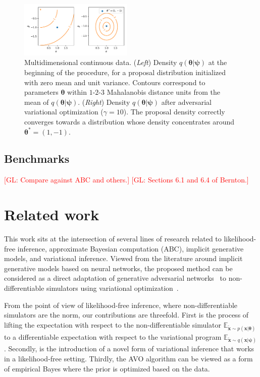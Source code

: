 \documentclass{article}
\newcommand{\glnote}[1]{\textcolor{red}{[GL: #1]}}
\newcommand{\bftheta}{{\bm \theta}}
\newcommand{\bfpsi}{{\bm \psi}}
\newcommand{\bfx}{\mathbf{x}}
\theoremstyle{plain}
\begin{document}
\begin{figure}
\centering
\includegraphics[width=0.48\textwidth]{figures/multi.pdf}
\caption{Multidimensional continuous data.
 ({\it Left}) Density $q(\bftheta|\bfpsi)$ at the beginning of the procedure, for a proposal distribution initialized with zero mean and unit variance.
              Contours correspond to parameters $\bftheta$ within $1$-$2$-$3$ Mahalanobis distance units from the mean of $q(\bftheta|\bfpsi)$.
 ({\it Right}) Density $q(\bftheta|\bfpsi)$ after adversarial variational optimization ($\gamma=10$).
               The proposal density correctly converges towards a distribution whose density concentrates around $\bftheta^* = (1, -1)$.
 }\label{fig:multi}
\end{figure}

\subsection{Benchmarks}

\glnote{Compare against ABC and others.}
\glnote{Sections 6.1 and 6.4 of Bernton.}




\section{Related work}

This work sits at the intersection of several lines of research related to
likelihood-free inference, approximate Bayesian computation (ABC),
implicit generative models, and variational inference.
Viewed from the literature around implicit generative models based on neural networks,
the proposed method can be considered as a direct adaptation of
generative adversarial networks~\cite{goodfellow2014generative,2017arXiv170104862A} to
non-differentiable simulators using variational optimization~\cite{2012arXiv1212.4507S}.

From the point of view of likelihood-free inference, where  non-differentiable
simulators are the norm, our contributions are threefold. First is the process
of lifting the expectation with respect to the non-differentiable simulator
$\mathbb{E}_{\tilde{\bfx} \sim p(\bfx | \bftheta)}$ to a differentiable
expectation with respect to the variational program $\mathbb{E}_{\tilde{\bfx}
\sim q(\bfx | \bfpsi)}$. Secondly, is the introduction of a novel form of
variational inference that works in a likelihood-free setting. Thirdly, the
AVO algorithm can be viewed as a form of empirical Bayes where the prior is
optimized based on the data.
\end{document}

